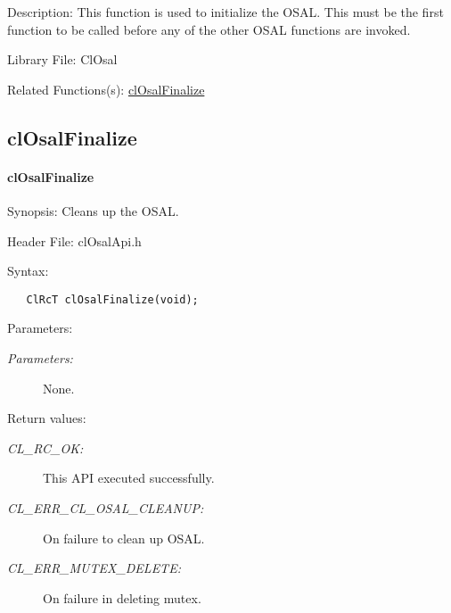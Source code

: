 \begin{Desc}
\item[Description:]This function is used to initialize the OSAL. This must be the first function to be called before any of the other OSAL functions are invoked.\end{Desc}
\begin{Desc}
\item[Library File:]Cl\-Osal\end{Desc}
\begin{Desc}
\item[Related Functions(s):]\hyperlink{pageosal102}{cl\-Osal\-Finalize} \end{Desc}


\newpage

\subsection{clOsalFinalize}
\hypertarget{pageosal102}{}\paragraph{cl\-Osal\-Finalize}\label{pageosal102}
\begin{Desc}
\item[Synopsis:]Cleans up the OSAL.\end{Desc}
\begin{Desc}
\item[Header File:]clOsalApi.h\end{Desc}
\begin{Desc}
\item[Syntax:]

\footnotesize\begin{verbatim}   ClRcT clOsalFinalize(void);
\end{verbatim}
\normalsize
\end{Desc}
\begin{Desc}
\item[Parameters:]
\begin{description}
\item[{\em Parameters:}]None.\end{description}
\end{Desc}
\begin{Desc}
\item[Return values:]
\begin{description}
\item[{\em CL\_\-RC\_\-OK:}]This API executed successfully. \item[{\em CL\_\-ERR\_\-CL\_\-OSAL\_\-CLEANUP:}]On failure to clean up OSAL. \item[{\em CL\_\-ERR\_\-MUTEX\_\-DELETE:}]On failure in deleting mutex.\end{description}
\end{Desc}
